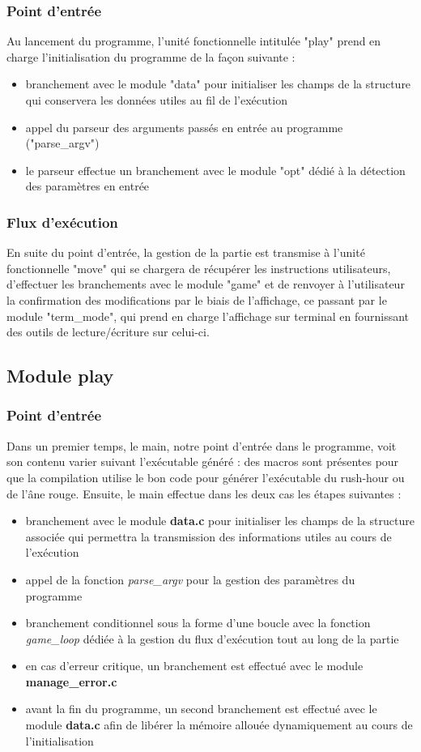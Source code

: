 \documentclass{report}
\begin{document}
\subsubsection*{Point d'entrée}
Au lancement du programme, l'unité fonctionnelle intitulée "play" prend en charge l'initialisation du programme de la façon suivante :
\begin{itemize}
\item branchement avec le module "data" pour initialiser les champs de la structure qui conservera les données utiles au fil de l'exécution
\item appel du parseur des arguments passés en entrée au programme ("parse\_argv")
\item le parseur effectue un branchement avec le module "opt" dédié à la détection des paramètres en entrée
\end{itemize}
\subsubsection*{Flux d'exécution}
En suite du point d'entrée, la gestion de la partie est transmise à l'unité fonctionnelle "move" qui se chargera de récupérer les instructions utilisateurs, d'effectuer les branchements avec le module "game" et de renvoyer à l'utilisateur la confirmation des modifications par le biais de l'affichage, ce passant par le module "term\_mode", qui prend en charge l'affichage sur terminal en fournissant des outils de lecture/écriture sur celui-ci.

\subsection{Module play}
\subsubsection*{Point d'entrée}
Dans un premier temps, le main, notre point d'entrée dans le programme, voit son contenu varier suivant l'exécutable généré : des macros sont présentes pour que la compilation utilise le bon code pour générer l'exécutable du rush-hour ou de l'âne rouge.
Ensuite, le main effectue dans les deux cas les étapes suivantes :
\begin{itemize}
\item branchement avec le module \textbf{data.c} pour initialiser les champs de la structure associée qui permettra la transmission des informations utiles au cours de l'exécution 
\item appel de la fonction \textit{parse\_argv} pour la gestion des paramètres du programme 
\item branchement conditionnel sous la forme d'une boucle avec la fonction \textit{game\_loop} dédiée à la gestion du flux d'exécution tout au long de la partie 
\item en cas d'erreur critique, un branchement est effectué avec le module \textbf{manage\_error.c} 
\item avant la fin du programme, un second branchement est effectué avec le module \textbf{data.c} afin de libérer la mémoire allouée dynamiquement au cours de l'initialisation
\end{itemize}
\end{document}
